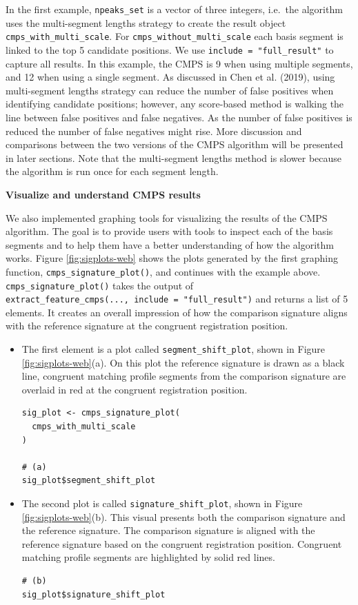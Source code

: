 In the first example, \texttt{npeaks\_set} is a vector of three integers, i.e.~the algorithm uses the multi-segment lengths strategy to create the result object \texttt{cmps\_with\_multi\_scale}.
For \texttt{cmps\_without\_multi\_scale} each basis segment is linked to the top 5 candidate positions.
We use \texttt{include\ =\ "full\_result"} to capture all results.
In this example, the CMPS is 9 when using multiple segments, and 12 when using a single segment.
As discussed in Chen et al. (2019), using multi-segment lengths strategy can reduce the number of false positives when identifying candidate positions; however, any score-based method is walking the line between false positives and false negatives.
As the number of false positives is reduced the number of false negatives might rise.
More discussion and comparisons between the two versions of the CMPS algorithm will be presented in later sections.
Note that the multi-segment lengths method is slower because the algorithm is run once for each segment length.

\textbf{Visualize and understand CMPS results}

We also implemented graphing tools for visualizing the results of the CMPS algorithm.
The goal is to provide users with tools to inspect each of the basis segments and to help them have a better understanding of how the algorithm works.
Figure \ref{fig:sigplots-web} shows the plots generated by the first graphing function, \texttt{cmps\_signature\_plot()}, and continues with the example above.
\texttt{cmps\_signature\_plot()} takes the output of \texttt{extract\_feature\_cmps(...,\ include\ =\ "full\_result")} and returns a list of 5 elements.
It creates an overall impression of how the comparison signature aligns with the reference signature at the congruent registration position.

\begin{itemize}
\item
  The first element is a plot called \texttt{segment\_shift\_plot}, shown in Figure \ref{fig:sigplots-web}(a). On this plot the reference signature is drawn as a black line, congruent matching profile segments from the comparison signature are overlaid in red at the congruent registration position.

\begin{verbatim}
sig_plot <- cmps_signature_plot(
  cmps_with_multi_scale
)

# (a)
sig_plot$segment_shift_plot
\end{verbatim}
\item
  The second plot is called \texttt{signature\_shift\_plot}, shown in Figure \ref{fig:sigplots-web}(b). This visual presents both the comparison signature and the reference signature. The comparison signature is aligned with the reference signature based on the congruent registration position. Congruent matching profile segments are highlighted by solid red lines.

\begin{verbatim}
# (b)
sig_plot$signature_shift_plot
\end{verbatim}
\end{itemize}

